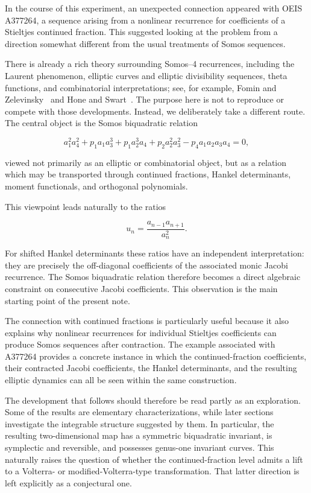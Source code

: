 \documentclass[11pt]{article}
\theoremstyle{remark}
\begin{document}
In the course of this experiment, an unexpected connection appeared with OEIS A377264, a sequence arising from a nonlinear recurrence for coefficients of a Stieltjes continued fraction. This suggested looking at the problem from a direction somewhat different from the usual treatments of Somos sequences.

There is already a rich theory surrounding Somos--4 recurrences, including the Laurent phenomenon, elliptic curves and elliptic divisibility sequences, theta functions, and combinatorial interpretations; see, for example, Fomin and Zelevinsky~\cite{FominZelevinsky2002} and Hone and Swart~\cite{HoneSwart2008}. The purpose here is not to reproduce or compete with those developments. Instead, we deliberately take a different route. The central object is the Somos biquadratic relation

$$
a_1^2a_4^2
+p_1a_1a_3^3
+p_1a_2^3a_4
+p_2a_2^2a_3^2
-p_4a_1a_2a_3a_4=0,
$$

viewed not primarily as an elliptic or combinatorial object, but as a relation which may be transported through continued fractions, Hankel determinants, moment functionals, and orthogonal polynomials.

This viewpoint leads naturally to the ratios

$$
u_n=\frac{a_{n-1}a_{n+1}}{a_n^2}.
$$

For shifted Hankel determinants these ratios have an independent interpretation: they are precisely the off-diagonal coefficients of the associated monic Jacobi recurrence. The Somos biquadratic relation therefore becomes a direct algebraic constraint on consecutive Jacobi coefficients. This observation is the main starting point of the present note.

The connection with continued fractions is particularly useful because it also explains why nonlinear recurrences for individual Stieltjes coefficients can produce Somos sequences after contraction. The example associated with A377264 provides a concrete instance in which the continued-fraction coefficients, their contracted Jacobi coefficients, the Hankel determinants, and the resulting elliptic dynamics can all be seen within the same construction.

The development that follows should therefore be read partly as an exploration. Some of the results are elementary characterizations, while later sections investigate the integrable structure suggested by them. In particular, the resulting two-dimensional map has a symmetric biquadratic invariant, is symplectic and reversible, and possesses genus-one invariant curves. This naturally raises the question of whether the continued-fraction level admits a lift to a Volterra- or modified-Volterra-type transformation. That latter direction is left explicitly as a conjectural one.
\end{document}
